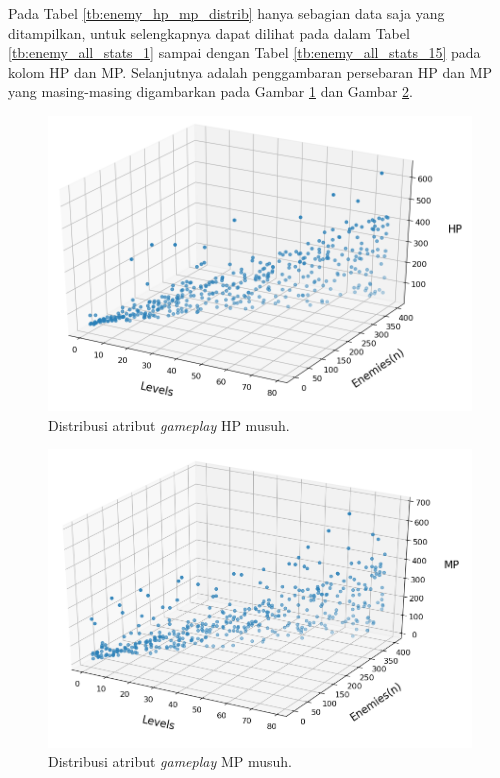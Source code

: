 Pada Tabel \ref{tb:enemy_hp_mp_distrib} hanya sebagian data saja yang ditampilkan, untuk selengkapnya dapat dilihat pada  dalam Tabel \ref{tb:enemy_all_stats_1} sampai dengan Tabel \ref{tb:enemy_all_stats_15} pada kolom HP dan MP. Selanjutnya adalah penggambaran persebaran HP dan MP yang masing-masing digambarkan pada Gambar \ref{fig:enemy_hp_distrib} dan Gambar \ref{fig:enemy_mp_distrib}.
\vspace{1ex}

\begin{figure} [!h] \centering
	\centering
	\includegraphics[scale=0.52]{img/EnemyHpDistrib.png}
	\caption{Distribusi atribut \textit{gameplay} HP musuh.}
	\label{fig:enemy_hp_distrib}
\end{figure}

\begin{figure} [!h] \centering
	\centering
	\includegraphics[scale=0.52]{img/EnemyMpDistrib.png}
	\caption{Distribusi atribut \textit{gameplay} MP musuh.}
	\label{fig:enemy_mp_distrib}
\end{figure}
\vspace{1ex}

